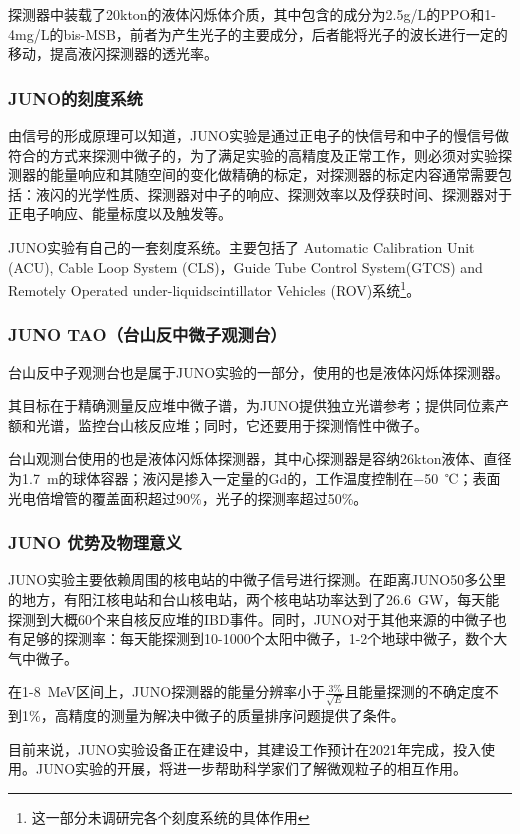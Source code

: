 \documentclass[15pt,a4paper]{article}
\begin{document}
探测器中装载了20kton的液体闪烁体介质，其中包含的成分为2.5g/L的PPO和1-4mg/L的bis-MSB，前者为产生光子的主要成分，后者能将光子的波长进行一定的移动，提高液闪探测器的透光率。

\subsubsection{JUNO的刻度系统}\label{sub:logicinter}
由信号的形成原理可以知道，JUNO实验是通过正电子的快信号和中子的慢信号做符合的方式来探测中微子的，为了满足实验的高精度及正常工作，则必须对实验探测器的能量响应和其随空间的变化做精确的标定，对探测器的标定内容通常需要包括：液闪的光学性质、探测器对中子的响应、探测效率以及俘获时间、探测器对于正电子响应、能量标度以及触发等。

JUNO实验有自己的一套刻度系统。主要包括了 Automatic Calibration Unit (ACU),
Cable Loop System (CLS)，Guide Tube Control System(GTCS) and Remotely Operated under-liquidscintillator Vehicles (ROV)系统\footnote{这一部分未调研完各个刻度系统的具体作用}。

\subsubsection{JUNO TAO（台山反中微子观测台）}\label{sub:logicinter}

台山反中子观测台也是属于JUNO实验的一部分，使用的也是液体闪烁体探测器。

其目标在于精确测量反应堆中微子谱，为JUNO提供独立光谱参考；提供同位素产额和光谱，监控台山核反应堆；同时，它还要用于探测惰性中微子。

台山观测台使用的也是液体闪烁体探测器，其中心探测器是容纳26kton液体、直径为\SI{1.7}{m}的球体容器；液闪是掺入一定量的Gd的，工作温度控制在\SI{-50}{℃}；表面光电倍增管的覆盖面积超过90\%，光子的探测率超过50\%。



\subsubsection{JUNO 优势及物理意义}\label{sub:logicinter}

JUNO实验主要依赖周围的核电站的中微子信号进行探测。在距离JUNO50多公里的地方，有阳江核电站和台山核电站，两个核电站功率达到了\SI{26.6}{GW}，每天能探测到大概60个来自核反应堆的IBD事件。同时，JUNO对于其他来源的中微子也有足够的探测率：每天能探测到10-1000个太阳中微子，1-2个地球中微子，数个大气中微子。

在1-\SI{8 }{MeV}区间上，JUNO探测器的能量分辨率小于$\frac{3\%}{\sqrt{E}}$且能量探测的不确定度不到1\%，高精度的测量为解决中微子的质量排序问题提供了条件。

目前来说，JUNO实验设备正在建设中，其建设工作预计在2021年完成，投入使用。JUNO实验的开展，将进一步帮助科学家们了解微观粒子的相互作用。
\end{document}
